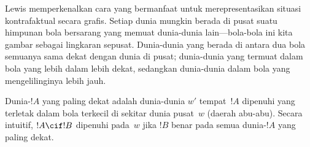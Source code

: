 \documentclass[../../../include/open-logic-section]{subfiles}
\begin{document}
Lewis memperkenalkan cara yang bermanfaat untuk merepresentasikan situasi
kontrafaktual secara grafis. Setiap dunia mungkin berada di pusat suatu
himpunan bola bersarang yang memuat dunia-dunia lain---bola-bola ini kita
gambar sebagai lingkaran sepusat. Dunia-dunia yang berada di antara dua bola
semuanya sama dekat dengan dunia di pusat; dunia-dunia yang termuat
dalam bola yang lebih dalam lebih dekat, sedangkan dunia-dunia dalam bola yang
mengelilinginya lebih jauh.
\begin{center}
\end{center}
Dunia-$!A$ yang paling dekat adalah dunia-dunia $w'$ tempat~$!A$ dipenuhi
yang terletak dalam bola terkecil di sekitar dunia pusat~$w$ (daerah abu-abu).
Secara intuitif, $!A \cif !B$ dipenuhi pada~$w$ jika $!B$ benar pada semua
dunia-$!A$ yang paling dekat.
\end{document}
